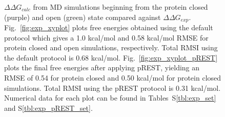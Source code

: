 \begin{figure}[!ht]
\begin{subfigure}{.5\textwidth}
\end{subfigure}\hfill
\caption{$\Delta\Delta G_{calc}$ from MD simulations beginning from the protein closed (purple) and open (green) state compared against $\Delta\Delta G_{exp}$. 
Fig.~\ref{fig:exp_xyplot} plots free energies obtained using the default protocol which gives a 1.0 kcal/mol and 0.58 kcal/mol RMSE for protein closed and open simulations, respectively.
Total RMSI using the default protocol is 0.68 kcal/mol. 
Fig.~\ref{fig:exp_xyplot_pREST} plots the final free energies after applying pREST, yielding an RMSE of 0.54 for protein closed and 0.50 kcal/mol for protein closed simulations.
Total RMSI using the pREST protocol is 0.31 kcal/mol.
Numerical data for each plot can be found in Tables~S\ref{tbl:exp_set} and S\ref{tbl:exp_pREST_set}.
} 
\label{fig:exp-xyplots}
\end{figure}


